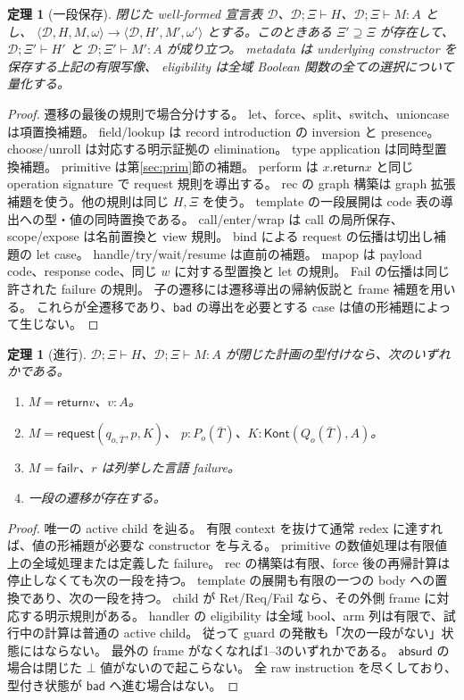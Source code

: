 \documentclass[11pt,a4paper]{article}
\newtheorem{theorem}[definition]{定理}
\newcommand{\Ret}{\mathsf{return}}
\newcommand{\Req}{\mathsf{request}}
\newcommand{\Fail}{\mathsf{fail}}
\newcommand{\Bad}{\mathsf{bad}}
\newcommand{\D}{\mathcal D}
\newcommand{\ty}{\mathrel{\vdash}}
\begin{document}
\begin{theorem}[一段保存]
閉じた well-formed 宣言表 \(\D\)、\(\D;\Xi\ty H\)、\(\D;\Xi\ty M:A\) とし、
\(\langle\D,H,M,\omega\rangle\to\langle\D,H',M',\omega'\rangle\)
とする。このときある \(\Xi'\supseteq\Xi\) が存在して、
\(\D;\Xi'\ty H'\) と \(\D;\Xi'\ty M':A\) が成り立つ。
metadata は underlying constructor を保存する上記の有限写像、
eligibility は全域 Boolean 関数の全ての選択について量化する。
\end{theorem}
\begin{proof}
遷移の最後の規則で場合分けする。
let、force、split、switch、unioncase は項置換補題。
field/lookup は record introduction の inversion と presence。
choose/unroll は対応する明示証拠の elimination。
type application は同時型置換補題。
primitive は第\ref{sec:prim}節の補題。
perform は \(x.\Ret x\) と同じ operation signature で request 規則を導出する。
rec の graph 構築は graph 拡張補題を使う。他の規則は同じ \(H,\Xi\) を使う。
template の一段展開は code 表の導出への型・値の同時置換である。
call/enter/wrap は call の局所保存、scope/expose は名前置換と view 規則。
bind による request の伝播は切出し補題の let case。
handle/try/wait/resume は直前の補題。
mapop は payload code、response code、同じ \(w\) に対する型置換と let の規則。
Fail の伝播は同じ許された failure の規則。
子の遷移には遷移導出の帰納仮説と frame 補題を用いる。
これらが全遷移であり、\(\Bad\) の導出を必要とする case は値の形補題によって生じない。
\end{proof}

\begin{theorem}[進行]
\(\D;\Xi\ty H\)、\(\D;\Xi\ty M:A\) が閉じた計画の型付けなら、次のいずれかである。
\begin{enumerate}
\item \(M=\Ret v\)、\(v:A\)。
\item \(M=\Req(q_{o,\bar T},p,K)\)、
      \(p:P_o(\bar T)\)、\(K:\mathsf{Kont}(Q_o(\bar T),A)\)。
\item \(M=\Fail r\)、\(r\) は列挙した言語 failure。
\item 一段の遷移が存在する。
\end{enumerate}
\end{theorem}
\begin{proof}
唯一の active child を辿る。
有限 context を抜けて通常 redex に達すれば、値の形補題が必要な constructor を与える。
primitive の数値処理は有限値上の全域処理または定義した failure。
rec の構築は有限、force 後の再帰計算は停止しなくても次の一段を持つ。
template の展開も有限の一つの body への置換であり、次の一段を持つ。
child が Ret/Req/Fail なら、その外側 frame に対応する明示規則がある。
handler の eligibility は全域 bool、arm 列は有限で、試行中の計算は普通の active child。
従って guard の発散も「次の一段がない」状態にはならない。
最外の frame がなくなれば1--3のいずれかである。
\(\mathsf{absurd}\) の場合は閉じた \(\bot\) 値がないので起こらない。
全 raw instruction を尽くしており、型付き状態が \(\Bad\) へ進む場合はない。
\end{proof}
\end{document}
